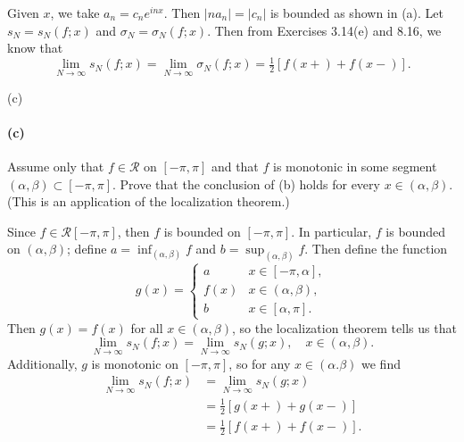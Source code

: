 \documentclass[12pt]{article}
\newenvironment{fullbox}{\begin{lrbox}{\savefullbox}\begin{minipage}{\dimexpr\textwidth-2\fboxsep\relax}}{\end{minipage}\end{lrbox}\begin{center}\framebox[\textwidth]{\usebox{\savefullbox}}\end{center}}
\newenvironment{pbox}[1][]{\begin{fullbox}\ifx#1\empty\else\paragraph{#1}\fi}{\end{fullbox}}
\theoremstyle{definition}
\newcommand{\RR}{\mathcal{R}}
\begin{document}
Given $x$, we take $a_n = c_ne^{inx}$. Then $|na_n| = |c_n|$ is bounded as shown in (a). Let $s_N = s_N(f; x)$ and $\sigma_N = \sigma_N(f; x)$. Then from Exercises 3.14(e) and 8.16, we know that
\[
    \lim_{N \to \infty} s_N(f; x)
        = \lim_{N \to \infty} \sigma_N(f; x)
        = \tfrac12[f(x+) + f(x-)].
\]


\newpage
\begin{pbox}[(c)]
    Assume only that $f \in \RR$ on $[-\pi, \pi]$ and that $f$ is monotonic in some segment $(\alpha, \beta) \subset [-\pi, \pi]$. Prove that the conclusion of (b) holds for every $x \in (\alpha, \beta)$. (This is an application of the localization theorem.)
\end{pbox}

Since $f \in \RR[-\pi, \pi]$, then $f$ is bounded on $[-\pi, \pi]$. In particular, $f$ is bounded on $(\alpha, \beta)$; define $a = \inf_{(\alpha, \beta)} f$ and $b = \sup_{(\alpha, \beta)} f$. Then define the function
\[
    g(x) = \begin{cases}
        a & x \in [-\pi, \alpha], \\
        f(x) & x \in (\alpha, \beta), \\
        b & x \in [\alpha, \pi].
    \end{cases}
\]
Then  $g(x) = f(x)$ for all $x \in (\alpha, \beta)$, so the localization theorem tells us that
\[
    \lim_{N \to \infty} s_N(f; x) = \lim_{N \to \infty} s_N(g; x), \quad x \in (\alpha, \beta).
\]
Additionally, $g$ is monotonic on $[-\pi, \pi]$, so for any $x \in (\alpha. \beta)$ we find
\begin{align*}
    \lim_{N \to \infty} s_N(f; x)
        &= \lim_{N \to \infty} s_N(g; x) \\
        &= \tfrac12[g(x+) + g(x-)] \\
        &= \tfrac12[f(x+) + f(x-)].
\end{align*}
\end{document}
